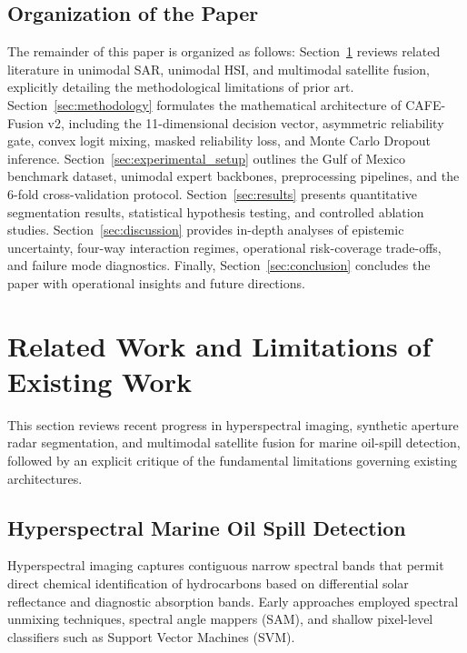 \documentclass[conference]{IEEEtran}
\begin{document}
\subsection{Organization of the Paper}
The remainder of this paper is organized as follows: Section~\ref{sec:related_work} reviews related literature in unimodal SAR, unimodal HSI, and multimodal satellite fusion, explicitly detailing the methodological limitations of prior art. Section~\ref{sec:methodology} formulates the mathematical architecture of CAFE-Fusion v2, including the 11-dimensional decision vector, asymmetric reliability gate, convex logit mixing, masked reliability loss, and Monte Carlo Dropout inference. Section~\ref{sec:experimental_setup} outlines the Gulf of Mexico benchmark dataset, unimodal expert backbones, preprocessing pipelines, and the 6-fold cross-validation protocol. Section~\ref{sec:results} presents quantitative segmentation results, statistical hypothesis testing, and controlled ablation studies. Section~\ref{sec:discussion} provides in-depth analyses of epistemic uncertainty, four-way interaction regimes, operational risk-coverage trade-offs, and failure mode diagnostics. Finally, Section~\ref{sec:conclusion} concludes the paper with operational insights and future directions.

\section{Related Work and Limitations of Existing Work}
\label{sec:related_work}

This section reviews recent progress in hyperspectral imaging, synthetic aperture radar segmentation, and multimodal satellite fusion for marine oil-spill detection, followed by an explicit critique of the fundamental limitations governing existing architectures.

\subsection{Hyperspectral Marine Oil Spill Detection}
Hyperspectral imaging captures contiguous narrow spectral bands that permit direct chemical identification of hydrocarbons based on differential solar reflectance and diagnostic absorption bands. Early approaches employed spectral unmixing techniques, spectral angle mappers (SAM), and shallow pixel-level classifiers such as Support Vector Machines (SVM). 
\end{document}
